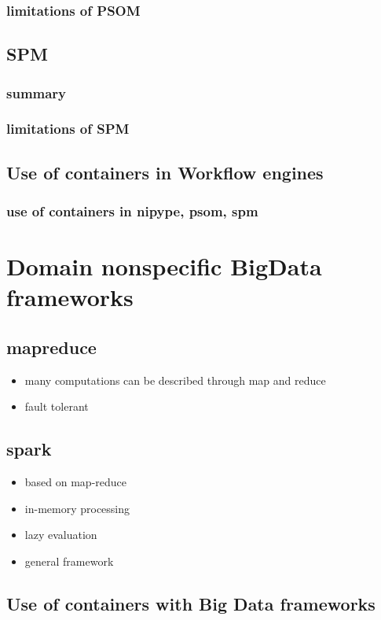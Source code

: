 \documentclass{report}
\begin{document}
		\subsection{limitations of PSOM}
	\section{SPM}
		\subsection{summary}
		\subsection{limitations of SPM}
	\section{Use of containers in Workflow engines}
		\subsection{use of containers in nipype, psom, spm}
		
\chapter{Domain nonspecific BigData frameworks}
	\section{mapreduce}
		\begin{itemize}
			\item many computations can be described through map and reduce
			\item fault tolerant
		\end{itemize}
	\section{spark}
		\begin{itemize}
			\item based on map-reduce
			\item in-memory processing
			\item lazy evaluation
			\item general framework
		\end{itemize}
	\section{Use of containers with Big Data frameworks}
\end{document}
